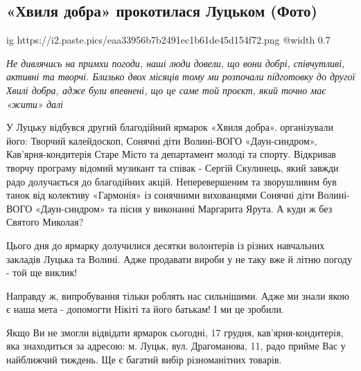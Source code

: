  
 
 
 
 
\subsection{«Хвиля добра» прокотилася Луцьком (Фото) }
\label{sec:18_12_2021.stz.news.ua.volyn.1.hvylja_dobra_luck}


\ifcmt
  ig https://i2.paste.pics/eaa33956b7b2491ec1b61de45d154f72.png
  @width 0.7
\fi

\begingroup
\Large\em\color{blue}
Не дивлячись на примхи погоди, наші люди довели, що вони добрі, співчутливі,
активні та творчі. Близько двох місяців тому ми розпочали підготовку до другої
Хвилі добра, адже були впевнені, що це саме той проєкт, який точно має «жити»
далі
\endgroup

У Луцьку відбувся другий благодійний ярмарок «Хвиля добра». організували його:
Творчий калейдоскоп, Сонячні діти Волині-ВОГО «Даун-синдром»,
Кав'ярня-кондитерія Старе Місто та департамент молоді та спорту. Відкривав
творчу програму відомий музикант та співак - Сергій Скулинець, який завжди радо
долучається до благодійних акцій. Неперевершеним та зворушливим був танок від
колективу «Гармонія» із сонячними вихованцями Сонячні діти Волині-ВОГО
«Даун-синдром» та пісня у виконанні Маргарита Ярута. А куди ж без Святого
Миколая?


Цього дня до ярмарку долучилися десятки волонтерів із різних навчальних
закладів Луцька та Волині. Адже продавати вироби у не таку вже й літню погоду -
той ще виклик!

Направду ж, випробування тільки роблять нас сильнішими. Адже ми знали якою є
наша мета - допомогти Нікіті та його батькам! І ми це зробили.

\begin{zznagolos}
Якщо Ви не змогли відвідати ярмарок сьогодні, 17 грудня, кав’ярня-кондитерія,
яка знаходиться за адресою: м. Луцьк, вул. Драгоманова, 11, радо прийме Вас у
найближчий тиждень. Ще є багатий вибір різноманітних товарів.	
\end{zznagolos}

